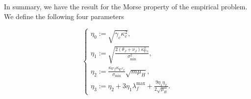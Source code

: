 %

In summary, we have the result for the Morse property of the empirical problem. We define the following four parameters

\[
\begin{cases}
	\eta_0:=\sqrt{ \gamma_c\kappa_c^2} ,\\
	\eta_1:=\sqrt{\frac{2(\theta_J+\nu_J)\kappa_{\nabla c}^2}{\sigma_{\min}^2} },\\
	\eta_2:=\tfrac{\kappa_{\nabla f}\kappa_{\nabla^2 c}}{\sigma_{\min}}\sqrt{m\mu_H},\\
	\eta_3:=\eta_2 +3\eta_1 \lambda_f^{\max}+\frac{9\eta_1\eta_2}{2\sqrt{\mu_H}}.
\end{cases}
\]

